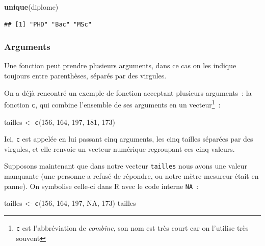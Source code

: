 \documentclass[12pt,]{book}
\newenvironment{Shaded}{\begin{snugshade}}{\end{snugshade}}
\newcommand{\DecValTok}[1]{\textcolor[rgb]{0.00,0.00,0.81}{#1}}
\newcommand{\KeywordTok}[1]{\textcolor[rgb]{0.13,0.29,0.53}{\textbf{#1}}}
\newcommand{\NormalTok}[1]{#1}
\newcommand{\OtherTok}[1]{\textcolor[rgb]{0.56,0.35,0.01}{#1}}
\newcommand{\StringTok}[1]{\textcolor[rgb]{0.31,0.60,0.02}{#1}}
\begin{document}
\begin{Shaded}
\begin{Highlighting}[]
\KeywordTok{unique}\NormalTok{(diplome)}
\end{Highlighting}
\end{Shaded}

\begin{verbatim}
## [1] "PHD" "Bac" "MSc"
\end{verbatim}

\hypertarget{arguments}{%
\subsubsection{Arguments}\label{arguments}}

Une fonction peut prendre plusieurs arguments, dans ce cas on les indique toujours entre parenthèses, séparés par des virgules.

On a déjà rencontré un exemple de fonction acceptant plusieurs arguments~: la fonction \texttt{c}, qui combine l'ensemble de ses arguments en un vecteur\footnote{\texttt{c} est l'abbréviation de \emph{combine}, son nom est très court car on l'utilise très souvent}~:

\begin{Shaded}
\begin{Highlighting}[]
\NormalTok{tailles <-}\StringTok{ }\KeywordTok{c}\NormalTok{(}\DecValTok{156}\NormalTok{, }\DecValTok{164}\NormalTok{, }\DecValTok{197}\NormalTok{, }\DecValTok{181}\NormalTok{, }\DecValTok{173}\NormalTok{)}
\end{Highlighting}
\end{Shaded}

Ici, \texttt{c} est appelée en lui passant cinq arguments, les cinq tailles séparées par des virgules, et elle renvoie un vecteur numérique regroupant ces cinq valeurs.

Supposons maintenant que dans notre vecteur \texttt{tailles} nous avons une valeur manquante (une personne a refusé de répondre, ou notre mètre mesureur était en panne). On symbolise celle-ci dans R avec le code interne \texttt{NA}~:

\begin{Shaded}
\begin{Highlighting}[]
\NormalTok{tailles <-}\StringTok{ }\KeywordTok{c}\NormalTok{(}\DecValTok{156}\NormalTok{, }\DecValTok{164}\NormalTok{, }\DecValTok{197}\NormalTok{, }\OtherTok{NA}\NormalTok{, }\DecValTok{173}\NormalTok{)}
\NormalTok{tailles}
\end{Highlighting}
\end{Shaded}
\end{document}
